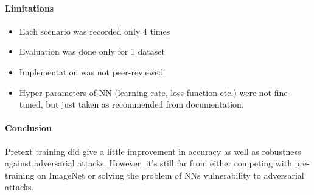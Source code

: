 
\paragraph{Limitations}
\begin{itemize}
    \item Each scenario was recorded only 4 times
    \item Evaluation was done only for 1 dataset
    \item Implementation was not peer-reviewed
    \item Hyper parameters of NN (learning-rate, loss function etc.) were not fine-tuned,
    but just taken as recommended from documentation.
\end{itemize}

\paragraph{Conclusion}
Pretext training did give a little improvement in accuracy as well as robustness against adversarial attacks.
However, it's still far from either competing with pre-training on ImageNet or solving the problem of NNs vulnerability
to adversarial attacks.

